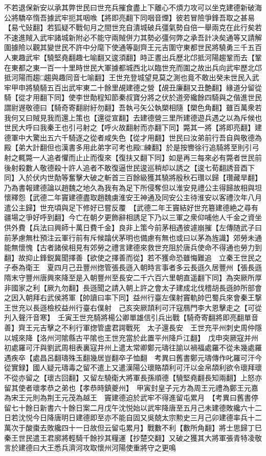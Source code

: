 不若退保新安以承其弊世民曰世充兵摧食盡上下離心不煩力攻可以坐克建德新破海公將驕卒惰吾據武牢扼其咽㗋【將即亮翻下同咽音煙】彼若冒險爭鋒吾取之甚易【易弋䜴翻】若狐疑不戰旬月之間世充自潰城破兵彊氣勢自倍一舉兩克在此行矣若不速進賊入武牢諸城新附必不能守兩賊併力其勢必彊何弊之承吾計决矣通等又請解圍據險以觀其變世民不許中分麾下使通等副齊王元吉圍守東都世民將驍勇三千五百人東趣武牢【驍堅堯翻趣七喻翻又逡須翻】時正晝出兵歷北邙抵河陽趨鞏而去【鞏在東都之東一百一十里時世民大軍據都城西北以臨世充而圍之故出兵向武牢歷北邙抵河陽而趨□趨與趣同音七喻翻】王世充登城望見莫之測也竟不敢出癸未世民入武牢甲申將驍騎五百出武牢東二十餘里覘建德之營【覘丑廉翻又丑艶翻】緣道分留從騎【從才用翻下同】使李世勣程知節秦叔寶分將之伏於道旁纔餘四騎與之偕進世民謂尉遟敬德曰【騎奇寄翻尉紆勿翻】吾執弓矢公執槊相隨【槊色角翻】雖百萬衆若我何又曰賊見我而還上策也【還從宣翻】去建德營三里所建德遊兵遇之以為斥候也世民大呼曰我秦王也引弓射之【呼火故翻射而亦翻下同】斃其一將【將即亮翻】建德軍中大驚出五六千騎逐之從者咸失色【從才用翻】世民曰汝弟前行吾自與敬德為殿【弟大計翻但也漢書多用此弟字可考也殿□練翻】於是按轡徐行追騎將至則引弓射之輒斃一人追者懼而止止而復來【復扶又翻下同】如是再三每來必有斃者世民前後射殺數人敬德殺十許人追者不敢復逼世民逡巡稍却以誘之【逡七荀翻誘音酉下同】入於伏内世勣等奮擊大破之斬首三百餘級獲其驍將殷秋石瓚以歸【瓚藏旱翻】乃為書報建德論以趙魏之地久為我有為足下所侵奪但以淮安見禮公主得歸故相與坦懷釋怨【武德二年竇建德盡取趙魏虜淮安王神通及同安公主待淮安以客禮㳄年八月遣公主歸】世充頃與足下修好已嘗反覆　【武德二年王竇結好世充簒建德絶之尋有疆場之爭好呼到翻】今亡在朝夕更飾辭相誘足下乃以三軍之衆仰哺他人千金之資坐供外費【兵法曰興師十萬日費千金】良非上策今前茅相遇彼遽崩摧【左傳随武子曰前茅慮無杜預注云軍行前有斥候蹹伏茅明也備慮有無也或曰以茅為旌識】郊勞未通能無懷愧【古者諸侯相見有郊勞之禮言建德來救世充阻於唐兵使命不得通也勞力到翻】故抑止鋒鋭冀聞擇善【欲使之擇善而從】若不獲命恐雖悔難追　立秦王世民之子泰為衛王　夏四月己丑豐州揔管張長遜入朝時言事者多云長遜久居豐州【張長遜隋末守豐州唐興來降至是入朝豐州至長安二千六百六里朝直遥翻下同】為突厥所厚非國家之利【厥九勿翻】長遜聞之請入朝上許之會太子建成北伐稽胡長遜帥所部會之因入朝拜右武侯將軍【帥讀曰率下同】益州行臺左僕射竇軌帥巴蜀兵來會秦王撃王世充以長遜檢校益州行臺右僕射　己亥突厥頡利可汗寇鴈門李大恩擊走之【可從刋入聲汗音寒】　壬寅王世充騎將楊公卿單雄信引兵出戰【騎奇寄翻將即亮翻單音善】齊王元吉擊之不利行軍揔管盧君諤戰死　太子還長安　王世充平州刺史周仲隱以城來降【洛州河隂縣古平隂也王世充當於此置平州降戶江翻】　戊申突厥寇并州初處羅可汗與劉武周相表裏寇井州上遣太常卿鄭元璹往諭以禍福處羅不從未幾處羅遇疾卒【處昌呂翻璹殊玉翻幾居豈翻卒子恤翻　考異曰舊書鄭元璹傳作叱羅可汗今從實録】國人疑元璹毒之留不遣上又遣漢陽公瓌賂頡利可汗以金帛頡利欲令瓌拜瓌不從亦留之【瓌古回翻】又留左驍衛大將軍長孫順德【驍堅堯翻長知兩翻】上怒亦留其使者瓌孝恭之弟也【孝恭時鎮夔州】　甲寅封皇子元方為周王元禮為鄭王元嘉為宋王元則為荆王元茂為越王　竇建德迫於武牢不得進留屯累月　【考異曰舊書停留七十餘日新書六十餘日案二月戊午沈悦始以武牢降唐至五月己未建德敗纔六十二日若沈悦今日降唐明日建德即至亦不能自固又吳兢太宗勲史三月己卯建德率兵十二萬次于酸棗去敗纔四十一日故但云留屯累月】戰數不利【數所角翻】將士思歸丁巳秦王世民遣王君廓將輕騎千餘抄其糧運【抄楚交翻】又破之獲其大將軍張青特凌敬言於建德曰大王悉兵濟河攻取懷州河陽使重將守之更鳴
